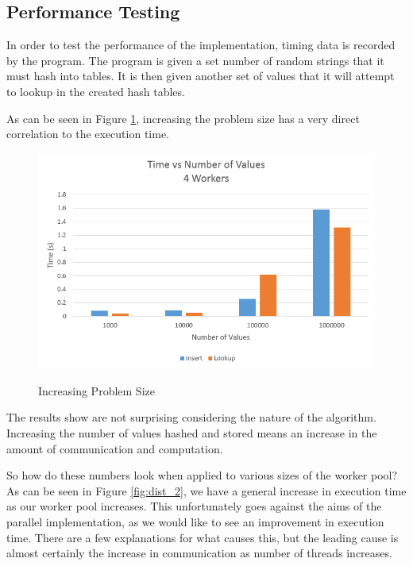 \documentclass{article}
\begin{document}
\subsection{Performance Testing}
In order to test the performance of the implementation, timing data is recorded by the program. The program is given a set number of random strings that it must hash into tables. It is then given another set of values that it will attempt to lookup in the created hash tables.

As can be seen in Figure \ref{fig:dist_1}, increasing the problem size has a very direct correlation to the execution time.
\begin{figure}[H]
  \caption{Increasing Problem Size}
  \centering
  \includegraphics[width=\textwidth]{dist_1}
    \label{fig:dist_1}
\end{figure}
The results show are not surprising considering the nature of the algorithm. Increasing the number of values hashed and stored means an increase in the amount of communication and computation.

So how do these numbers look when applied to various sizes of the worker pool? As can be seen in Figure \ref{fig:dist_2}, we have a general increase in execution time as our worker pool increases. This unfortunately goes against the aims of the parallel implementation, as we would like to see an improvement in execution time. There are a few explanations for what causes this, but the leading cause is almost certainly the increase in communication as number of threads increases.
\end{document}

